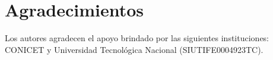 \documentclass[journal]{IEEEtran}
\begin{document}
\section*{Agradecimientos}

Los autores agradecen el apoyo brindado por las siguientes instituciones: CONICET y Universidad Tecnológica Nacional (SIUTIFE0004923TC).


\ifCLASSOPTIONcaptionsoff
  \newpage
\fi



%
%
%



\end{document}
